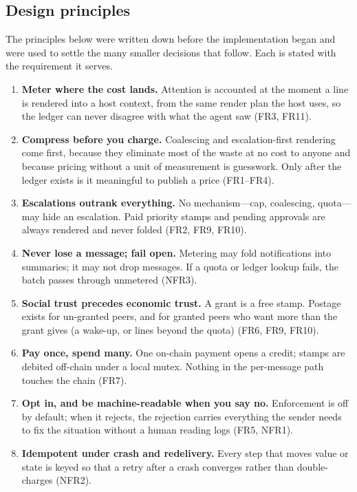\subsection{Design principles}
\label{sec:design-principles}

The principles below were written down before the implementation began and were used to
settle the many smaller decisions that follow. Each is stated with the requirement it
serves.

\begin{enumerate}[label=P\arabic*.]
  \item \textbf{Meter where the cost lands.} Attention is accounted at the moment a line is
        rendered into a host context, from the same render plan the host uses, so the ledger
        can never disagree with what the agent saw (FR3, FR11).
  \item \textbf{Compress before you charge.} Coalescing and escalation-first rendering come
        first, because they eliminate most of the waste at no cost to anyone and because
        pricing without a unit of measurement is guesswork. Only after the ledger exists is
        it meaningful to publish a price (FR1--FR4).
  \item \textbf{Escalations outrank everything.} No mechanism---cap, coalescing, quota---may
        hide an escalation. Paid priority stamps and pending approvals are always rendered
        and never folded (FR2, FR9, FR10).
  \item \textbf{Never lose a message; fail open.} Metering may fold notifications into
        summaries; it may not drop messages. If a quota or ledger lookup fails, the batch
        passes through unmetered (NFR3).
  \item \textbf{Social trust precedes economic trust.} A grant is a free stamp. Postage
        exists for un-granted peers, and for granted peers who want more than the grant
        gives (a wake-up, or lines beyond the quota) (FR6, FR9, FR10).
  \item \textbf{Pay once, spend many.} One on-chain payment opens a credit; stamps are
        debited off-chain under a local mutex. Nothing in the per-message path touches the
        chain (FR7).
  \item \textbf{Opt in, and be machine-readable when you say no.} Enforcement is off by
        default; when it rejects, the rejection carries everything the sender needs to fix
        the situation without a human reading logs (FR5, NFR1).
  \item \textbf{Idempotent under crash and redelivery.} Every step that moves value or
        state is keyed so that a retry after a crash converges rather than double-charges
        (NFR2).
\end{enumerate}

